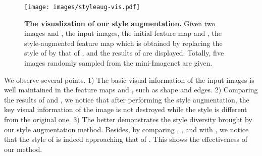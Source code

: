 \documentclass{article}
\begin{document}
\begin{figure*}[h]
	\centering
	\texttt{[image: images/styleaug-vis.pdf]}
\caption{\textbf{The visualization of our style augmentation.} Given two images  and , the input images, the initial feature map  and , the style-augmented feature map  which is obtained by replacing the style of  by that of , and the results of  are displayed. Totally, five images randomly sampled from the mini-Imagenet are given.}
	\label{fig:styleAug} 
\end{figure*}

 
We observe several points. 1) The basic visual information of the input images is well maintained in the feature maps  and , such as shape and edges. 2) Comparing the results of  and , we notice that after performing the style augmentation, the key visual information of the image is not destroyed while the style is different from the original one. 3) The  better demonstrates the style diversity brought by our style augmentation method. Besides, by comparing , , and  with , we notice that the style of  is indeed approaching that of . This shows the effectiveness of our method.
\end{document}
